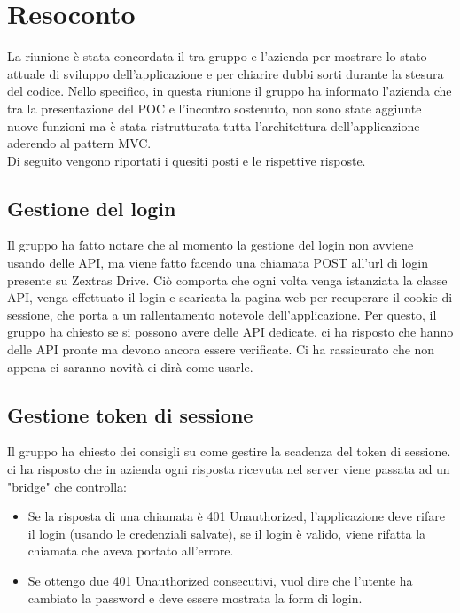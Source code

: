 \section{Resoconto}

La riunione è stata concordata il tra gruppo \textit{\Gruppo{}} e l'azienda per mostrare lo stato attuale di sviluppo dell'applicazione e per chiarire dubbi sorti durante la stesura del codice.
Nello specifico, in questa riunione il gruppo ha informato l'azienda che tra la presentazione del POC e l'incontro sostenuto, non sono state aggiunte nuove funzioni ma è stata ristrutturata tutta l'architettura dell'applicazione aderendo al pattern MVC. \\
Di seguito vengono riportati i quesiti posti e le rispettive risposte.

\subsection{Gestione del login}
Il gruppo ha fatto notare che al momento la gestione del login non avviene usando delle API, ma viene fatto facendo una chiamata POST all'url di login presente su Zextras Drive.
Ciò comporta che ogni volta venga istanziata la classe API, venga effettuato il login e scaricata la pagina web per recuperare il cookie di sessione, che porta a un rallentamento notevole dell'applicazione. Per questo, il gruppo ha chiesto se si possono avere delle API dedicate. \textit{\Federico{}} ci ha risposto che hanno delle API pronte ma devono ancora essere verificate. Ci ha rassicurato che non appena ci saranno novità ci dirà come usarle.

\subsection{Gestione token di sessione}
Il gruppo ha chiesto dei consigli su come gestire la scadenza del token di sessione. \textit{\Alessio{}} ci ha risposto che in azienda ogni risposta ricevuta nel server viene passata ad un "bridge" che controlla:
\begin{itemize}
    \item Se la risposta di una chiamata è 401 Unauthorized, l'applicazione deve rifare il login (usando le credenziali salvate), se il login è valido, viene rifatta la chiamata che aveva portato all'errore.
    \item Se ottengo due 401 Unauthorized consecutivi, vuol dire che l'utente ha cambiato la password e deve essere mostrata la form di login.
\end{itemize}

